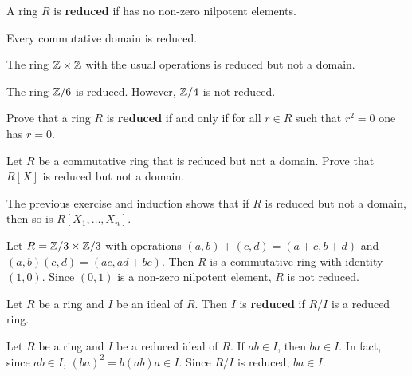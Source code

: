 \begin{definition}
     A ring $R$ is \textbf{reduced} if 
     has no non-zero nilpotent elements. 
\end{definition}

Every commutative domain is reduced. 

\begin{example}
    The ring $\mathbb{Z}\times\mathbb{Z}$ with the usual operations 
    is reduced but not a domain. 
\end{example}

\begin{example}
    The ring $\mathbb{Z}/6$ is reduced. However, $\mathbb{Z}/4$ is not reduced. 
\end{example}

\begin{exercise}
\label{xca:reduced}
    Prove that a ring $R$ is \textbf{reduced} if and only 
    if for all $r\in R$ such that $r^2=0$ one has $r=0$.
\end{exercise}


\begin{exercise}
    \label{xca:reduced_RX}
    Let $R$ be a commutative ring that is reduced but not a domain.
    Prove that $R[X]$ is reduced but not a domain. 
\end{exercise}

The previous exercise and induction 
shows that if $R$ is reduced but not a domain, 
then so is $R[X_1,\dots,X_n]$. 

\begin{example}
    Let $R=\mathbb{Z}/3\times\mathbb{Z}/3$ with
    operations $(a,b)+(c,d)=(a+c,b+d)$ and 
    $(a,b)(c,d)=(ac,ad+bc)$. Then $R$ is a commutative
    ring with identity $(1,0)$. Since 
    $(0,1)$ is a non-zero nilpotent element, $R$ is not reduced. 
\end{example}

\begin{definition}
    Let $R$ be a ring and $I$ be an ideal of $R$. 
    Then $I$ is \textbf{reduced} if $R/I$ is a reduced ring. 
\end{definition}

Let $R$ be a ring and 
$I$ be a reduced ideal of $R$. If $ab\in I$, then 
$ba\in I$. In fact, since $ab\in I$, 
$(ba)^2=b(ab)a\in I$.
Since $R/I$ is reduced, $ba\in I$. 

